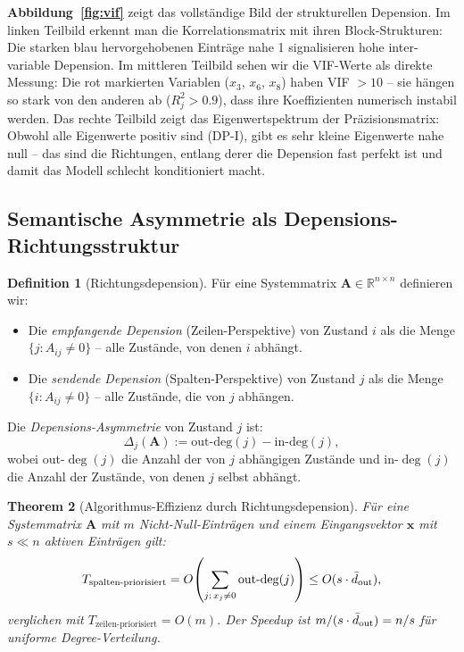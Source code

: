 ﻿\documentclass[12pt, a4paper]{article}
\newtheorem{theorem}{Theorem}[section]
\theoremstyle{definition}
\newtheorem{definition}[theorem]{Definition}
\theoremstyle{remark}
\newcommand{\R}{\mathbb{R}}
\newcommand{\vx}{\bm{x}}
\newcommand{\vA}{\bm{A}}
\begin{document}
\textbf{Abbildung~\ref{fig:vif}} zeigt das vollständige Bild der strukturellen
Depension. Im linken Teilbild erkennt man die Korrelationsmatrix mit ihren
Block-Strukturen: Die starken blau hervorgehobenen Einträge nahe 1 signalisieren
hohe inter-variable Depension. Im mittleren Teilbild sehen wir die VIF-Werte als
direkte Messung: Die rot markierten Variablen ($x_3$, $x_6$, $x_8$) haben VIF $> 10$
-- sie hängen so stark von den anderen ab ($R_j^2 > 0.9$), dass ihre Koeffizienten
numerisch instabil werden. Das rechte Teilbild zeigt das Eigenwertspektrum der
Präzisionsmatrix: Obwohl alle Eigenwerte positiv sind (DP-I), gibt es sehr kleine
Eigenwerte nahe null -- das sind die Richtungen, entlang derer die Depension fast
perfekt ist und damit das Modell schlecht konditioniert macht.

\subsection{Semantische Asymmetrie als Depensions-Richtungsstruktur}

\begin{definition}[Richtungsdepension]
\label{def:richtungsdep}
Für eine Systemmatrix $\vA \in \R^{n \times n}$ definieren wir:
\begin{itemize}
  \item Die \emph{empfangende Depension} (Zeilen-Perspektive) von Zustand $i$ als
    die Menge $\{j : A_{ij} \neq 0\}$ -- alle Zustände, von denen $i$ abhängt.
  \item Die \emph{sendende Depension} (Spalten-Perspektive) von Zustand $j$ als
    die Menge $\{i : A_{ij} \neq 0\}$ -- alle Zustände, die von $j$ abhängen.
\end{itemize}
Die \emph{Depensions-Asymmetrie} von Zustand $j$ ist:
\begin{equation}
  \Delta_j(\vA) := \mathrm{out\text{-}deg}(j) - \mathrm{in\text{-}deg}(j),
  \label{eq:asymm}
\end{equation}
wobei out-$\deg(j)$ die Anzahl der von $j$ abhängigen Zustände und in-$\deg(j)$
die Anzahl der Zustände, von denen $j$ selbst abhängt.
\end{definition}

\begin{theorem}[Algorithmus-Effizienz durch Richtungsdepension]
\label{thm:effizienz}
Für eine Systemmatrix $\vA$ mit $m$ Nicht-Null-Einträgen und einem Eingangsvektor
$\vx$ mit $s \ll n$ aktiven Einträgen gilt:
\begin{equation}
  T_{\text{spalten-priorisiert}} = O\!\left(\sum_{j:\,x_j\neq 0} \mathrm{out\text{-}deg}(j)\right)
  \leq O(s \cdot \bar{d}_{\rm out}),
  \label{eq:sparse_eff}
\end{equation}
verglichen mit $T_{\text{zeilen-priorisiert}} = O(m)$. Der Speedup ist
$m / (s \cdot \bar{d}_{\rm out}) = n / s$ für uniforme Degree-Verteilung.
\end{theorem}
\end{document}
